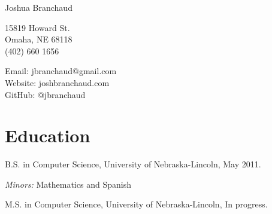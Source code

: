 \documentclass[10pt,letterpaper]{article}
\def\name{Joshua Branchaud}
\renewenvironment{itemize}{
  \begin{list}{}{
    \setlength{\leftmargin}{1.5em}
    \setlength{\itemsep}{0.25em}
    \setlength{\parskip}{0pt}
    \setlength{\parsep}{0.25em}
  }
}{
  \end{list}
}
\begin{document}
{\huge \name}


\vspace{0.25in}

\begin{minipage}[t]{0.5\textwidth}
  15819 Howard St. \\
  Omaha, NE 68118 \\
  (402) 660 1656
\end{minipage}
\begin{minipage}[t]{0.5\textwidth}
  Email: jbranchaud@gmail.com \\
  Website: joshbranchaud.com \\
  GitHub: @jbranchaud
\end{minipage}


%

\section*{Education}

\begin{itemize}



  \item B.S. in Computer Science, University of Nebraska-Lincoln, May 2011.

    \begin{itemize}
        \item \textit{Minors:} Mathematics and Spanish
    \end{itemize}
    
    \item M.S. in Computer Science, University of Nebraska-Lincoln, In
    progress.

\end{itemize}
\end{document}
